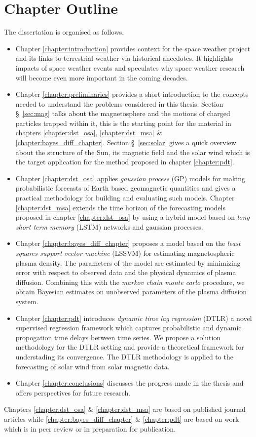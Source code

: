\section{Chapter Outline}

The dissertation is organised as follows.

\begin{itemize}
    \item Chapter \ref{chapter:introduction} provides context for the space weather project and its 
    links to terrestrial weather via historical anecdotes. It highlights impacts of space weather events 
    and speculates why space weather research will become even more important in the coming decades.
    \item Chapter \ref{chapter:preliminaries} provides a short introduction to the concepts needed to 
    understand the problems considered in this thesis. Section \S~\ref{sec:mag} talks about the magnetosphere and 
    the motions of charged particles trapped within it, this is the starting point for the material in chapters 
    \ref{chapter:dst_osa}, \ref{chapter:dst_msa} \& \ref{chapter:bayes_diff_chapter}. Section \S~\ref{sec:solar} gives a 
    quick overview about the structure of the Sun, its magnetic field and the solar wind which is the target 
    application for the method proposed in chapter \ref{chapter:pdt}.
    \item Chapter \ref{chapter:dst_osa} applies \emph{gaussian process} (GP) models for making probabilistic forecasts of 
    Earth based geomagnetic quantities and gives a practical methodology for building and evaluating such models. 
    Chapter \ref{chapter:dst_msa} extends the time horizon of the forecasting models proposed in chapter \ref{chapter:dst_osa} 
    by using a hybrid model based on \emph{long short term memory} (LSTM) networks and gaussian processes.
    \item Chapter \ref{chapter:bayes_diff_chapter} proposes a model based on the \emph{least squares support vector machine} (LSSVM) 
    for estimating magnetospheric plasma density. The parameters of the model are estimated by minimizing error with respect to 
    observed data and the physical dynamics of plasma diffusion. Combining this with the \emph{markov chain monte carlo} procedure, we 
    obtain Bayesian estimates on unobserved parameters of the plasma diffusion system.   
    \item Chapter \ref{chapter:pdt} introduces \emph{dynamic time lag regression} (DTLR) a novel supervised regression framework 
    which captures probabilistic and dynamic propogation time delays between time series. We propose a solution methodology for 
    the DTLR setting and provide a theoretical framework for understading its convergence. The DTLR methodology is applied to the 
    forecasting of solar wind from solar magnetic data. 
    \item Chapter \ref{chapter:conclusions} discusses the progress made in the thesis and offers perspectives for future research.
\end{itemize}


Chapters \ref{chapter:dst_osa} \& \ref{chapter:dst_msa} are based on published journal articles while \ref{chapter:bayes_diff_chapter} \& 
\ref{chapter:pdt} are based on work which is in peer review or in preparation for publication.  